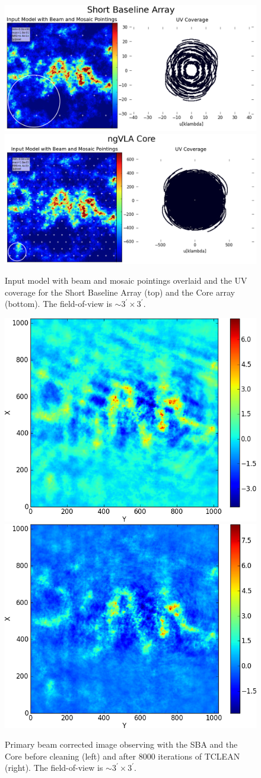 \documentclass[12pt]{article}
\begin{document}
{\begin{figure}
\centering
\includegraphics[width=0.8\columnwidth]{figs54/sba.png}
\includegraphics[width=0.8\columnwidth]{figs54/core.png}
\caption{Input model with beam and mosaic pointings overlaid and the UV coverage for the Short Baseline Array (top) and the Core array (bottom). The field-of-view is $\sim$$3^\prime \times 3^\prime$. }
\label{fig:simobserve}

\end{figure}


\begin{figure}
\centering
\includegraphics[width=0.4\columnwidth]{figs54/dirty.png} \includegraphics[width=0.4\columnwidth]{figs54/clean.png}
\caption{Primary beam corrected image observing with the SBA and the Core before cleaning (left) and after 8000 iterations of TCLEAN (right). The field-of-view is $\sim$$3^\prime \times 3^\prime$.}
\label{fig:clean}
\end{figure}

}
\end{document}
